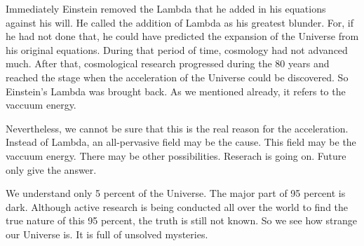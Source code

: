 Immediately Einstein removed the Lambda that he added in his equations
against his will. He called the addition of Lambda as his greatest
blunder. For, if he had not done that, he could have predicted the
expansion of the Universe from his original equations.
During that period of time, cosmology had not advanced much. After
that, cosmological research progressed during the 80 years and
reached the stage when the acceleration of the Universe could be
discovered. So Einstein's Lambda was brought back. As we mentioned
already, it refers to the vaccuum energy.

Nevertheless, we cannot be sure that this is the real reason for
the acceleration. Instead of Lambda, an all-pervasive field may
be the cause. This field may be the vaccuum energy. There may
be other possibilities. Reserach is going on. Future only give
the answer.

We understand only 5 percent of the Universe. The major part of
95 percent is dark. Although active research is being conducted
all over the world to find the true nature of this 95 percent,
the truth is still not known. So we see how strange our Universe
is. It is full of unsolved mysteries.
